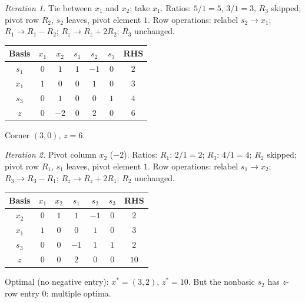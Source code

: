\begin{solutions}
        \emph{Iteration 1.} Tie between $x_1$ and $x_2$; take $x_1$.
        Ratios: $5/1=5$, $3/1=3$, $R_3$ skipped; pivot row $R_2$, $s_2$
        leaves, pivot element $1$. Row operations: relabel $s_2\to x_1$;
        $R_1\to R_1-R_2$; $R_z\to R_z+2R_2$; $R_3$ unchanged.
        \begin{center}
        \begin{tabular}{c|ccccc|c}
        Basis & $x_1$ & $x_2$ & $s_1$ & $s_2$ & $s_3$ & RHS\\
        \hline
        $s_1$ & $0$ & $1$ & $1$ & $-1$ & $0$ & $2$\\
        $x_1$ & $1$ & $0$ & $0$ & $1$ & $0$ & $3$\\
        $s_3$ & $0$ & $1$ & $0$ & $0$ & $1$ & $4$\\
        \hline
        $z$ & $0$ & $-2$ & $0$ & $2$ & $0$ & $6$\\
        \end{tabular}
        \end{center}
        Corner $(3,0)$, $z=6$.

        \emph{Iteration 2.} Pivot column $x_2$ ($-2$). Ratios: $R_1$:
        $2/1=2$; $R_3$: $4/1=4$; $R_2$ skipped; pivot row $R_1$, $s_1$
        leaves, pivot element $1$. Row operations: relabel $s_1\to x_2$;
        $R_3\to R_3-R_1$; $R_z\to R_z+2R_1$; $R_2$ unchanged.
        \begin{center}
        \begin{tabular}{c|ccccc|c}
        Basis & $x_1$ & $x_2$ & $s_1$ & $s_2$ & $s_3$ & RHS\\
        \hline
        $x_2$ & $0$ & $1$ & $1$ & $-1$ & $0$ & $2$\\
        $x_1$ & $1$ & $0$ & $0$ & $1$ & $0$ & $3$\\
        $s_3$ & $0$ & $0$ & $-1$ & $1$ & $1$ & $2$\\
        \hline
        $z$ & $0$ & $0$ & $2$ & $0$ & $0$ & $10$\\
        \end{tabular}
        \end{center}
        Optimal (no negative entry): $x^{*}=(3,2)$, $z^{*}=10$. But the
        nonbasic $s_2$ has $z$-row entry $0$: multiple optima.


\end{solutions}

